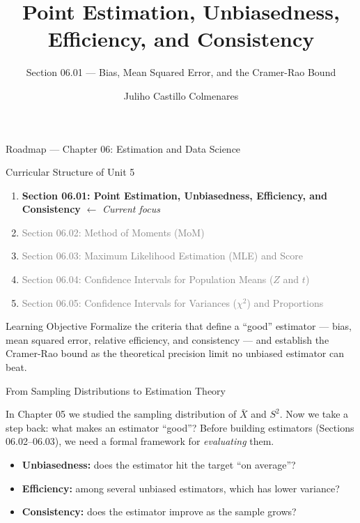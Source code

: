 \documentclass[aspectratio=169,xcolor={dvipsnames,table}]{beamer}
\title{Point Estimation, Unbiasedness, Efficiency, and Consistency}
\subtitle{Section 06.01 --- Bias, Mean Squared Error, and the Cramer-Rao Bound}
\author[J. Castillo Colmenares]{Juliho Castillo Colmenares}
\institute[Tec de Monterrey]{Tecnologico de Monterrey}
\date{\vspace{-1.5cm}}
\begin{document}
\begin{frame}[plain]
	\titlepage
\end{frame}

\begin{frame}{Roadmap --- Chapter 06: Estimation and Data Science}
	\vspace{-0.15cm}
	\begin{block}{Curricular Structure of Unit 5}
		\footnotesize
		\begin{enumerate}\itemsep=0.03cm
			\item \textbf{\textcolor{TecRojo}{Section 06.01: Point Estimation, Unbiasedness, Efficiency, and Consistency}} $\leftarrow$ \emph{Current focus}
			\item \textcolor{gray}{Section 06.02: Method of Moments (MoM)}
			\item \textcolor{gray}{Section 06.03: Maximum Likelihood Estimation (MLE) and Score}
			\item \textcolor{gray}{Section 06.04: Confidence Intervals for Population Means ($Z$ and $t$)}
			\item \textcolor{gray}{Section 06.05: Confidence Intervals for Variances ($\chi^2$) and Proportions}
		\end{enumerate}
	\end{block}
	\vspace{-0.2cm}
	\begin{alertblock}{Learning Objective}
		\scriptsize
		Formalize the criteria that define a ``good'' estimator --- bias, mean squared error, relative efficiency, and consistency --- and establish the Cramer-Rao bound as the theoretical precision limit no unbiased estimator can beat.
	\end{alertblock}
\end{frame}

\begin{frame}{From Sampling Distributions to Estimation Theory}
	\footnotesize
	\begin{motivacion}
		In Chapter 05 we studied the sampling distribution of $\bar X$ and $S^2$. Now we take a step back: what makes an estimator ``good''? Before building estimators (Sections 06.02--06.03), we need a formal framework for \emph{evaluating} them.
	\end{motivacion}
	\vspace{0.15cm}
	\pause
	\begin{itemize}\itemsep=0.1cm
		\item \textbf{Unbiasedness:} does the estimator hit the target ``on average''? \pause
		\item \textbf{Efficiency:} among several unbiased estimators, which has lower variance? \pause
		\item \textbf{Consistency:} does the estimator improve as the sample grows?
	\end{itemize}
\end{frame}
\end{document}
